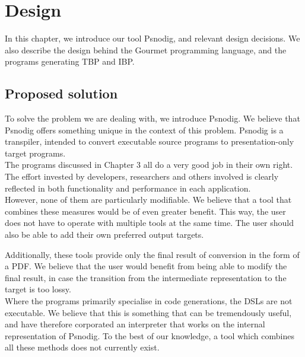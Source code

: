 \chapter{Design}

In this chapter, we introduce our tool Psnodig, and relevant design decisions. We also describe the design behind the Gourmet programming language, and the programs generating TBP and IBP.

\section{Proposed solution}

To solve the problem we are dealing with, we introduce Psnodig. We believe that Psnodig offers something unique in the context of this problem. Psnodig is a transpiler, intended to convert executable source programs to presentation-only target programs. \hfill \\

The programs discussed in Chapter 3 all do a very good job in their own right. The effort invested by developers, researchers and others involved is clearly reflected in both functionality and performance in each application. \hfill \\

However, none of them are particularly modifiable. We believe that a tool that combines these measures would be of even greater benefit. This way, the user does not have to operate with multiple tools at the same time. The user should also be able to add their own preferred output targets.


Additionally, these tools provide only the final result of conversion in the form of a PDF. We believe that the user would benefit from being able to modify the final result, in case the transition from the intermediate representation to the target is too lossy. \hfill \\

Where the programs primarily specialise in code generations, the DSLs are not executable. We believe that this is something that can be tremendously useful, and have therefore corporated an interpreter that works on the internal representation of Psnodig. To the best of our knowledge, a tool which combines all these methods does not currently exist. \hfill \\

